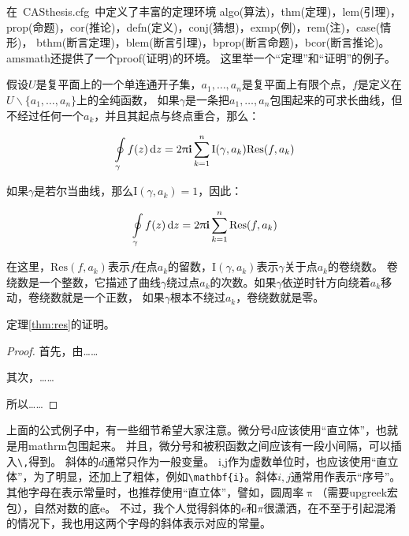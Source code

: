 在~CASthesis.cfg~中定义了丰富的定理环境
algo(算法)，thm(定理)，lem(引理)，prop(命题)，cor(推论)，defn(定义)，conj(猜想)，exmp(例)，rem(注)，case(情形)，
bthm(断言定理)，blem(断言引理)，bprop(断言命题)，bcor(断言推论)。
amsmath还提供了一个proof(证明)的环境。
这里举一个``定理''和``证明''的例子。
\begin{thm}[留数定理]
\label{thm:res}
  假设$U$是复平面上的一个单连通开子集，$a_1,\ldots,a_n$是复平面上有限个点，$f$是定义在$U\backslash \{a_1,\ldots,a_n\}$上的全纯函数，
  如果$\gamma$是一条把$a_1,\ldots,a_n$包围起来的可求长曲线，但不经过任何一个$a_k$，并且其起点与终点重合，那么：

  \begin{equation}
    \label{eq:res}
    \ointop_{\gamma}f(z)\,\mathrm{d}z = 2\uppi\mathbf{i}\sum^n_{k=1}\mathrm{I}(\gamma,a_k)\mathrm{Res}(f,a_k)
  \end{equation}

  如果$\gamma$是若尔当曲线，那么$\mathrm{I}(\gamma, a_k)=1$，因此：

  \begin{equation}
    \label{eq:resthm}
    \ointop_{\gamma}f(z)\,\mathrm{d}z = 2\uppi\mathbf{i}\sum^n_{k=1}\mathrm{Res}(f,a_k)
  \end{equation}


  在这里，$\mathrm{Res}(f, a_k)$表示$f$在点$a_k$的留数，$\mathrm{I}(\gamma,a_k)$表示$\gamma$关于点$a_k$的卷绕数。
  卷绕数是一个整数，它描述了曲线$\gamma$绕过点$a_k$的次数。如果$\gamma$依逆时针方向绕着$a_k$移动，卷绕数就是一个正数，
  如果$\gamma$根本不绕过$a_k$，卷绕数就是零。

  定理\ref{thm:res}的证明。
  
  \begin{proof}
    首先，由……

    其次，……

    所以……
  \end{proof}
\end{thm}

上面的公式例子中，有一些细节希望大家注意。微分号d应该使用``直立体''，也就是用mathrm包围起来。
并且，微分号和被积函数之间应该有一段小间隔，可以插入\verb+\,+得到。
斜体的$d$通常只作为一般变量。
i,j作为虚数单位时，也应该使用``直立体''，为了明显，还加上了粗体，例如\verb+\mathbf{i}+。斜体$i,j$通常用作表示``序号''。
其他字母在表示常量时，也推荐使用``直立体''，譬如，圆周率$\uppi$（需要upgreek宏包），自然对数的底$\mathrm{e}$。
不过，我个人觉得斜体的$e$和$\pi$很潇洒，在不至于引起混淆的情况下，我也用这两个字母的斜体表示对应的常量。


